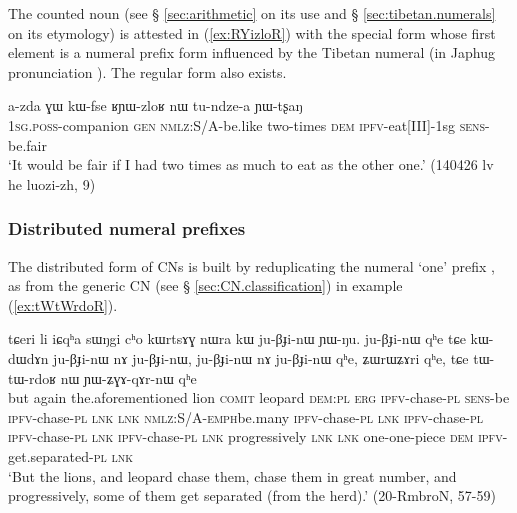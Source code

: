 The counted noun  (see § \ref{sec:arithmetic} on its use and § \ref{sec:tibetan.numerals} on its etymology) is attested in (\ref{ex:RYizloR}) with the special form  whose first element is a numeral prefix form  influenced by the Tibetan numeral  (in Japhug pronunciation ). The regular form  also exists.
 
\begin{exe}
\ex \label{ex:RYizloR}
\gll a-zda ɣɯ kɯ-fse ʁɲɯ-zloʁ nɯ tu-ndze-a ɲɯ-tʂaŋ \\
 \textsc{1sg}.\textsc{poss}-companion \textsc{gen} \textsc{nmlz}:S/A-be.like two-times \textsc{dem} \textsc{ipfv}-eat[III]-1sg \textsc{sens}-be.fair \\
\glt `It would be fair if I had two times as much to eat as the other one.' (140426 lv he luozi-zh, 9)
\end{exe}

\subsubsection{Distributed numeral prefixes} \label{sec:numeral.prefixes.distributed}
The distributed form of CNs is built by reduplicating the numeral `one' prefix , as  from the generic CN  (see § \ref{sec:CN.classification}) in example (\ref{ex:tWtWrdoR}).

\begin{exe}
\ex  \label{ex:tWtWrdoR}
\gll 
tɕeri li iɕqʰa sɯŋgi cʰo kɯrtsɤɣ nɯra kɯ ju-βɟi-nɯ ɲɯ-ŋu. ju-βɟi-nɯ qʰe tɕe kɯ-dɯ\redp{}dɤn ju-βɟi-nɯ nɤ ju-βɟi-nɯ, ju-βɟi-nɯ nɤ ju-βɟi-nɯ qʰe, ʑɯrɯʑɤri qʰe, tɕe tɯ-tɯ-rdoʁ nɯ ɲɯ-ʑɣɤ-qɤr-nɯ qʰe \\
but again the.aforementioned  lion \textsc{comit} leopard \textsc{dem}:\textsc{pl} \textsc{erg} \textsc{ipfv}-chase-\textsc{pl} \textsc{sens}-be \textsc{ipfv}-chase-\textsc{pl} \textsc{lnk} \textsc{lnk} \textsc{nmlz}:S/A-\textsc{emph}\redp{}be.many \textsc{ipfv}-chase-\textsc{pl} \textsc{lnk} \textsc{ipfv}-chase-\textsc{pl}  \textsc{ipfv}-chase-\textsc{pl} \textsc{lnk} \textsc{ipfv}-chase-\textsc{pl} \textsc{lnk} progressively \textsc{lnk} \textsc{lnk} one-one-piece \textsc{dem} \textsc{ipfv}-get.separated-\textsc{pl} \textsc{lnk} \\
\glt `But the lions, and leopard chase them, chase them in great number, and progressively, some of them get separated (from the herd).' (20-RmbroN, 57-59)
\end{exe}

